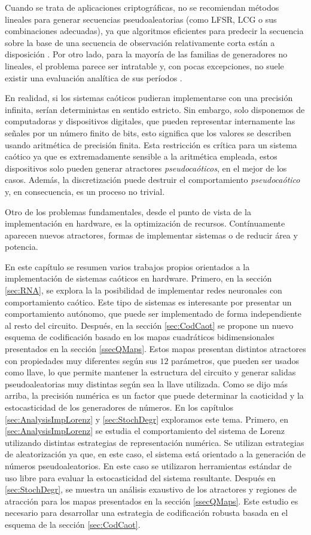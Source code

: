 Cuando se trata de aplicaciones criptográficas, no se recomiendan métodos lineales para generar secuencias pseudoaleatorias (como LFSR, LCG o sus combinaciones adecuadas), ya que algoritmos eficientes para predecir la secuencia sobre la base de una secuencia de observación relativamente corta están a disposición \cite{Boyar1989, Plumstead1982}.
Por otro lado, para la mayoría de las familias de generadores no lineales, el problema parece ser intratable y, con pocas excepciones, no suele existir una evaluación analítica de sus períodos \cite{kocarev2011}.

En realidad, si los sistemas caóticos pudieran implementarse con una precisión infinita, serían deterministas en sentido estricto.
Sin embargo, solo disponemos de computadoras y dispositivos digitales, que pueden representar internamente las señales por un número finito de bits, esto significa que los valores se describen usando aritmética de precisión finita.
Esta restricción es crítica para un sistema caótico ya que es extremadamente sensible a la aritmética empleada, estos dispositivos solo pueden generar atractores \textsl{pseudocaóticos}, en el mejor de los casos.
Además, la discretización puede destruir el comportamiento \textsl{pseudocaótico} y, en consecuencia, es un proceso no trivial.

Otro de los problemas fundamentales, desde el punto de vista de la implementación en hardware, es la optimización de recursos.
Contínuamente aparecen nuevos atractores, formas de implementar sistemas o de reducir área y potencia.

En este capítulo se resumen varios trabajos propios orientados a la implementación de sistemas caóticos en hardware.
Primero, en la sección \ref{sec:RNA}, se explora la la posibilidad de implementar redes neuronales con comportamiento caótico.
Este tipo de sistemas es interesante por presentar un comportamiento autónomo, que puede ser implementado de forma independiente al resto del circuito.
Después, en la sección \ref{sec:CodCaot} se propone un nuevo esquema de codificación basado en los mapas cuadráticos bidimensionales presentados en la sección \ref{ssecQMaps}.
Estos mapas presentan distintos atractores con propiedades muy diferentes según sus $12$ parámetros, que pueden ser usados como llave, lo que permite mantener la estructura del circuito y generar salidas pseudoaleatorias muy distintas según sea la llave utilizada.
Como se dijo más arriba, la precisión numérica es un factor que puede determinar la caoticidad y la estocasticidad de los generadores de números.
En los capítulos \ref{sec:AnalysisImpLorenz} y \ref{sec:StochDegr} exploramos este tema.
Primero, en \ref{sec:AnalysisImpLorenz} se estudia el comportamiento del sistema de Lorenz utilizando distintas estrategias de representación numérica.
Se utilizan estrategias de aleatorización ya que, en este caso, el sistema está orientado a la generación de números pseudoaleatorios.
En este caso se utilizaron herramientas estándar de uso libre para evaluar la estocasticidad del sistema resultante.
Después en \ref{sec:StochDegr}, se muestra un análisis exaustivo de los atractores y regiones de atracción para los mapas presentados en la sección \ref{ssecQMaps}.
Este estudio es necesario para desarrollar una estrategia de codificación robusta basada en el esquema de la sección \ref{sec:CodCaot}.